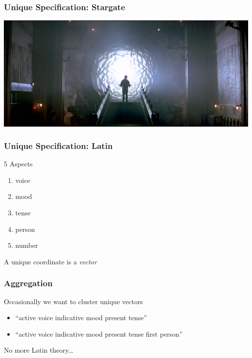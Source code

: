 \documentclass[slidestop,compress,mathserif]{beamer}
\begin{document}
\begin{frame}
	\frametitle{Unique Specification:  Stargate}
	\includegraphics[scale=0.25]{img/stargate.jpg}
	\vskip 0.5cm
\end{frame}

\begin{frame}
	\frametitle{Unique Specification:  Latin}
	5 Aspects
	\begin{enumerate}
		\item voice
		\pause
		\item mood
		\pause
		\item tense
		\pause
		\item person
		\pause
		\item number
		\pause
	\end{enumerate}
	\vskip 0.5cm
	A unique coordinate is a \emph{vector}
\end{frame}

\begin{frame}
	\frametitle{Aggregation}
	Occasionally we want to cluster unique vectors
	\pause
	\begin{itemize}
		\item ``active voice indicative mood present tense''
		\pause
		\item ``active voice indicative mood present tense first person''
	\end{itemize}
\end{frame}

\begin{frame}
	No more Latin theory\ldots
\end{frame}
\end{document}
